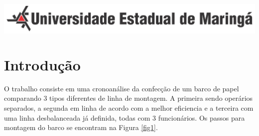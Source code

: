\documentclass[
	12pt,				%
	oneside,			%
	a4paper,			%
	english,			%
	french,				%
	spanish,			%
	brazil,				%
	]{abntex2}
\begin{document}
\begin{minipage}[c][2cm][c]{3cm} %
\centering
\includegraphics[scale=1]{uem-logo.png} 

\end{minipage}


\frenchspacing 


\imprimircapa

\imprimirfolhaderosto*

\tableofcontents*
\newpage

\section[Introdução]{Introdução}
\pagestyle{fancy}

O trabalho consiste em uma cronoanálise da confecção de um barco de papel comparando 3 tipos diferentes de linha de montagem. A primeira sendo operários separados, a segunda em linha de acordo com a melhor eficiencia e a terceira com uma linha desbalanceada já definida, todas com 3 funcionários. Os passos para montagem do barco se encontram na Figura \ref{fig1}.
\end{document}
